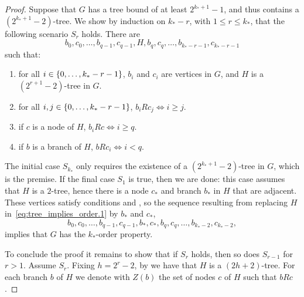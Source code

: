 \begin{theorem}
\begin{proof}
                Suppose that $G$ has a tree bound of at least $2^{k_*+1}-1$, and thus contains a $(2^{k_*+1}-2)$-tree.
                We show by induction on $k_*-r$, with $1 \leq r \leq k_*$, that the following scenario $S_r$ holds.
                There are
                \begin{equation}\label{eq:tree_implies_order.1}
                    b_0, c_0, \dots, b_{q-1}, c_{q-1}, H, b_q, c_q, \dots, b_{k_*-r-1}, c_{k_*-r-1}
                \end{equation}
                such that:
                \begin{enumerate}[label={\Roman*}., ref={\Roman*}, font=\rmfamily]
                    \item\label{itm:tree_implies_order.1} for all $i \in \{ 0, \dots, k_*-r-1 \}$, $b_i$ and $c_i$ are vertices in $G$,
                        and $H$ is a $(2^{r+1}-2)$-tree in $G$.
                    \item\label{itm:tree_implies_order.2} for all $i,j \in \{ 0, \dots, k_*-r-1 \}$, $b_i R c_j \Leftrightarrow i \geq j$.
                    \item\label{itm:tree_implies_order.3} if $c$ is a node of $H$, $b_i R c \Leftrightarrow i \geq q$.
                    \item\label{itm:tree_implies_order.4} if $b$ is a branch of $H$, $b R c_i \Leftrightarrow i < q$.
                \end{enumerate}

                The initial case $S_{k_*}$ only requires the existence of a $(2^{k_*+1}-2)$-tree in $G$, which is the premise.
                If the final case $S_1$ is true, then we are done:
                this case assumes that $H$ is a $2$-tree, hence there is a node $c_*$ and branch $b_*$ in $H$ that are adjacent.
                These vertices satisfy conditions  and , so
                the sequence resulting from replacing $H$ in~\eqref{eq:tree_implies_order.1} by $b_*$ and $c_*$,
                \[
                    b_0, c_0, \dots, b_{q-1}, c_{q-1}, b_*, c_*, b_q, c_q, \dots, b_{k_*-2}, c_{k_*-2},
                \]
                implies that $G$ has the $k_*$-order property.

                To conclude the proof it remains to show that if $S_r$ holds, then so does $S_{r-1}$ for $r>1$.
                Assume $S_r$.
                Fixing $h = 2^r - 2$, by  we have that $H$ is a $(2h +2)$-tree.
                For each branch $b$ of $H$ we denote with $Z(b)$ the set of nodes $c$ of $H$ such that $b R c$.


\end{proof}
\end{theorem}
